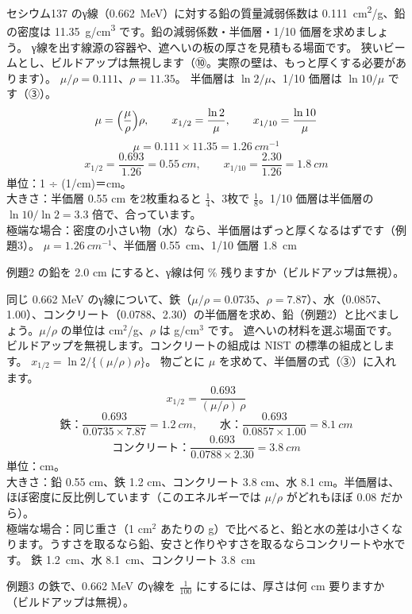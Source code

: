 \label{ph:原-13:ex2}
\begin{phreidai}
セシウム137 のγ線（\qty{0.662}{MeV}）に対する鉛の質量減弱係数は \qty{0.111}{cm^2/g}、鉛の密度は \qty{11.35}{g/cm^3} です。鉛の減弱係数・半価層・1/10 価層を求めましょう。
\phbamen
γ線を出す線源の容器や、遮へいの板の厚さを見積もる場面です。
\phmushi
狭いビームとし、ビルドアップは無視します（⑩。実際の壁は、もっと厚くする必要があります）。
\phzu
$\mu/\rho=0.111$、$\rho=11.35$。
\phriyu
半価層は $\ln2/\mu$、1/10 価層は $\ln10/\mu$ です（③）。
\phtateru
\[ \mu=\Bigl(\frac{\mu}{\rho}\Bigr)\rho,\qquad x_{1/2}=\frac{\ln2}{\mu},\qquad x_{1/10}=\frac{\ln10}{\mu} \]
\phtoku
\[ \mu=0.111\times11.35=\qty{1.26}{cm^{-1}} \]
\[ x_{1/2}=\frac{0.693}{1.26}=\qty{0.55}{cm},\qquad x_{1/10}=\frac{2.30}{1.26}=\qty{1.8}{cm} \]
\phtashikame
単位：1 ÷ (1/cm)＝cm。\\
大きさ：半価層 0.55 cm を2枚重ねると $\tfrac14$、3枚で $\tfrac18$。1/10 価層は半価層の $\ln10/\ln2=3.3$ 倍で、合っています。\\
極端な場合：密度の小さい物（水）なら、半価層はずっと厚くなるはずです（例題3）。
\kotae $\mu=\qty{1.26}{cm^{-1}}$、半価層 \qty{0.55}{cm}、1/10 価層 \qty{1.8}{cm}
\end{phreidai}
\begin{jibun}
例題2 の鉛を 2.0 cm にすると、γ線は何 \% 残りますか（ビルドアップは無視）。
\end{jibun}

\label{ph:原-13:ex3}
\begin{phreidai}[鉄・水・コンクリートの半価層]
同じ 0.662 MeV のγ線について、鉄（$\mu/\rho=0.0735$、$\rho=7.87$）、水（0.0857、1.00）、コンクリート（0.0788、2.30）の半価層を求め、鉛（例題2）と比べましょう。$\mu/\rho$ の単位は cm$^2$/g、$\rho$ は g/cm$^3$ です。
\phbamen
遮へいの材料を選ぶ場面です。
\phmushi
ビルドアップを無視します。コンクリートの組成は NIST の標準の組成とします。
\phzu
$x_{1/2}=\ln2/\{(\mu/\rho)\rho\}$。
\phriyu
物ごとに $\mu$ を求めて、半価層の式（③）に入れます。
\phtateru
\[ x_{1/2}=\frac{0.693}{(\mu/\rho)\,\rho} \]
\phtoku
\[ \text{鉄：}\frac{0.693}{0.0735\times7.87}=\qty{1.2}{cm},\qquad \text{水：}\frac{0.693}{0.0857\times1.00}=\qty{8.1}{cm} \]
\[ \text{コンクリート：}\frac{0.693}{0.0788\times2.30}=\qty{3.8}{cm} \]
\phtashikame
単位：cm。\\
大きさ：鉛 0.55 cm、鉄 1.2 cm、コンクリート 3.8 cm、水 8.1 cm。半価層は、ほぼ密度に反比例しています（このエネルギーでは $\mu/\rho$ がどれもほぼ 0.08 だから）。\\
極端な場合：同じ重さ（1 cm$^2$ あたりの g）で比べると、鉛と水の差は小さくなります。うすさを取るなら鉛、安さと作りやすさを取るならコンクリートや水です。
\kotae 鉄 \qty{1.2}{cm}、水 \qty{8.1}{cm}、コンクリート \qty{3.8}{cm}
\end{phreidai}
\begin{jibun}
例題3 の鉄で、0.662 MeV のγ線を $\tfrac1{100}$ にするには、厚さは何 cm 要りますか（ビルドアップは無視）。
\end{jibun}

